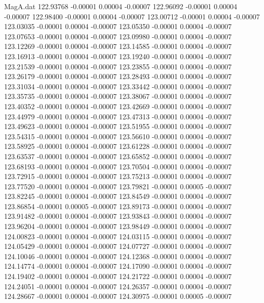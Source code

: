 \begin{filecontents}{MagA.dat}
 122.93768   -0.00001    0.00004   -0.00007
 122.96092   -0.00001    0.00004   -0.00007
 122.98400   -0.00001    0.00004   -0.00007
 123.00712   -0.00001    0.00004   -0.00007
 123.03035   -0.00001    0.00004   -0.00007
 123.05350   -0.00001    0.00004   -0.00007
 123.07653   -0.00001    0.00004   -0.00007
 123.09980   -0.00001    0.00004   -0.00007
 123.12269   -0.00001    0.00004   -0.00007
 123.14585   -0.00001    0.00004   -0.00007
 123.16913   -0.00001    0.00004   -0.00007
 123.19240   -0.00001    0.00004   -0.00007
 123.21539   -0.00001    0.00004   -0.00007
 123.23855   -0.00001    0.00004   -0.00007
 123.26179   -0.00001    0.00004   -0.00007
 123.28493   -0.00001    0.00004   -0.00007
 123.31034   -0.00001    0.00004   -0.00007
 123.33442   -0.00001    0.00004   -0.00007
 123.35735   -0.00001    0.00004   -0.00007
 123.38067   -0.00001    0.00004   -0.00007
 123.40352   -0.00001    0.00004   -0.00007
 123.42669   -0.00001    0.00004   -0.00007
 123.44979   -0.00001    0.00004   -0.00007
 123.47313   -0.00001    0.00004   -0.00007
 123.49623   -0.00001    0.00004   -0.00007
 123.51955   -0.00001    0.00004   -0.00007
 123.54315   -0.00001    0.00004   -0.00007
 123.56610   -0.00001    0.00004   -0.00007
 123.58925   -0.00001    0.00004   -0.00007
 123.61228   -0.00001    0.00004   -0.00007
 123.63537   -0.00001    0.00004   -0.00007
 123.65852   -0.00001    0.00004   -0.00007
 123.68193   -0.00001    0.00004   -0.00007
 123.70504   -0.00001    0.00004   -0.00007
 123.72915   -0.00001    0.00004   -0.00007
 123.75213   -0.00001    0.00004   -0.00007
 123.77520   -0.00001    0.00004   -0.00007
 123.79821   -0.00001    0.00005   -0.00007
 123.82245   -0.00001    0.00004   -0.00007
 123.84549   -0.00001    0.00004   -0.00007
 123.86854   -0.00001    0.00005   -0.00007
 123.89173   -0.00001    0.00004   -0.00007
 123.91482   -0.00001    0.00004   -0.00007
 123.93843   -0.00001    0.00004   -0.00007
 123.96204   -0.00001    0.00004   -0.00007
 123.98449   -0.00001    0.00004   -0.00007
 124.00823   -0.00001    0.00004   -0.00007
 124.03115   -0.00001    0.00004   -0.00007
 124.05429   -0.00001    0.00004   -0.00007
 124.07727   -0.00001    0.00004   -0.00007
 124.10046   -0.00001    0.00004   -0.00007
 124.12368   -0.00001    0.00004   -0.00007
 124.14774   -0.00001    0.00004   -0.00007
 124.17090   -0.00001    0.00004   -0.00007
 124.19402   -0.00001    0.00004   -0.00007
 124.21722   -0.00001    0.00004   -0.00007
 124.24051   -0.00001    0.00004   -0.00007
 124.26357   -0.00001    0.00004   -0.00007
 124.28667   -0.00001    0.00004   -0.00007
 124.30975   -0.00001    0.00005   -0.00007

\end{filecontents}
